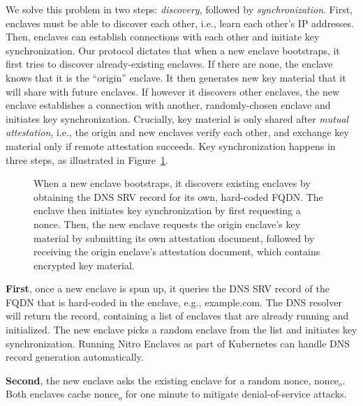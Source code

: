 We solve this problem in two steps: \emph{discovery}, followed by
\emph{synchronization}.  First, enclaves must be able to discover each other,
i.e., learn each other's IP addresses.  Then, enclaves can establish connections
with each other and initiate key synchronization.  Our protocol dictates that
when a new enclave bootstraps, it first tries to discover already-existing
enclaves.  If there are none, the enclave knows that it is the ``origin''
enclave.  It then generates new key material that it will share with future
enclaves.  If however it discovers other enclaves, the new enclave establishes a
connection with another, randomly-chosen enclave and initiates key
synchronization.  Crucially, key material is only shared after \emph{mutual
attestation}, i.e., the origin and new enclaves verify each other, and exchange
key material only if remote attestation succeeds.  Key synchronization happens
in three steps, as illustrated in Figure~\ref{fig:key-synchronization}.

\begin{figure}[t]
  \centering
  
  \caption{When a new enclave bootstraps, it discovers existing enclaves by
    obtaining the DNS SRV record for its own, hard-coded FQDN.  The enclave then
    initiates key synchronization by first requesting a nonce.  Then, the new
    enclave requests the origin enclave's key material by submitting its own
    attestation document, followed by receiving the origin enclave's attestation
    document, which contains encrypted key material.}
  \label{fig:key-synchronization}
\end{figure}

\textbf{First}, once a new enclave is spun up, it queries the DNS SRV record of
the FQDN that is hard-coded in the enclave, e.g., example.com.  The DNS resolver
will return the record, containing a list of enclaves that are already running
and initialized.  The new enclave picks a random enclave from the list and
initiates key synchronization.  Running Nitro Enclaves as part of Kubernetes
can handle DNS record generation automatically.

\textbf{Second}, the new enclave asks the existing enclave for a random nonce,
$\textrm{nonce}_o$.  Both enclaves cache $\textrm{nonce}_o$ for one minute to
mitigate denial-of-service attacks.

